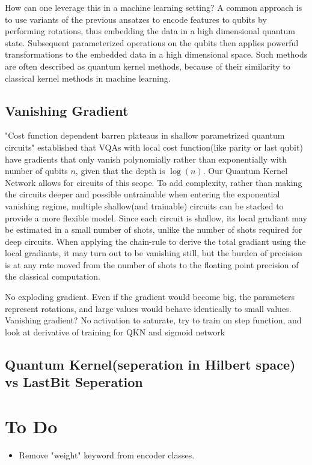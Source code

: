 \documentclass[]{article}
\begin{document}
How can one leverage this in a machine learning setting? A common approach is to use variants of the previous ansatzes to encode features to qubits by performing rotations, thus embedding the data in a high dimensional quantum state. Subsequent parameterized operations on the qubits then applies powerful transformations to the embedded data in a high dimensional space. Such methods are often described as quantum kernel methods, because of their similarity to classical kernel methods in machine learning.

\subsection{Vanishing Gradient}
"Cost function dependent barren plateaus in shallow parametrized quantum circuits" established that VQAs with local cost function(like parity or last qubit) have gradients that only vanish polynomially rather than exponentially with number of qubits $n$, given that the depth is $\log(n)$. Our Quantum Kernel Network allows for circuits of this scope. To add complexity, rather than making the circuits deeper and possible untrainable when entering the exponential vanishing regime, multiple shallow(and trainable) circuits can be stacked to provide a more flexible model. Since each circuit is shallow, its local gradiant may be estimated in a small number of shots, unlike the number of shots required for deep circuits. When applying the chain-rule to derive the total gradiant using the local gradiants, it may turn out to be vanishing still, but the burden of precision is at any rate moved from the number of shots to the floating point precision of the classical computation.  

No exploding gradient. Even if the gradient would become big, the parameters represent rotations, and large values would behave identically to small values. Vanishing gradient? No activation to saturate, try to train on step function, and look at derivative of training for QKN and sigmoid network

\subsection{Quantum Kernel(seperation in Hilbert space) vs LastBit Seperation}

\newpage
\printbibliography[heading=bibintoc, title={References}]

\section{To Do}
\begin{itemize}
    \item Remove "weight" keyword from encoder classes.
\end{itemize}
\end{document}
